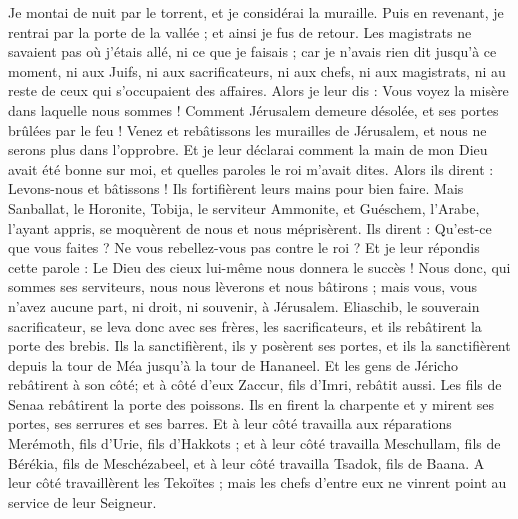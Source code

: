 \begin{multicols}{2}
Je montai de nuit par le torrent, et je considérai la muraille. Puis en revenant, je rentrai par la porte de la vallée ; et ainsi je fus de retour.
Les magistrats ne savaient pas où j'étais allé, ni ce que je faisais ; car je n'avais rien dit jusqu’à ce moment, ni aux Juifs, ni aux sacrificateurs, ni aux chefs, ni aux magistrats, ni au reste de ceux qui s'occupaient des affaires.
Alors je leur dis : Vous voyez la misère dans laquelle nous sommes ! Comment Jérusalem demeure désolée, et ses portes brûlées par le feu ! Venez et rebâtissons les murailles de Jérusalem, et nous ne serons plus dans l’opprobre.
Et je leur déclarai comment la main de mon Dieu avait été bonne sur moi, et quelles paroles le roi m'avait dites. Alors ils dirent : Levons-nous et bâtissons ! Ils fortifièrent leurs mains pour bien faire.
Mais Sanballat, le Horonite, Tobija, le serviteur Ammonite, et Guéschem, l’Arabe, l'ayant appris, se moquèrent de nous et nous méprisèrent. Ils dirent : Qu'est-ce que vous faites ? Ne vous rebellez-vous pas contre le roi ?
Et je leur répondis cette parole : Le Dieu des cieux lui-même nous donnera le succès ! Nous donc, qui sommes ses serviteurs, nous nous lèverons et nous bâtirons ; mais vous, vous n'avez aucune part, ni droit, ni souvenir, à Jérusalem.
\VerseOne{}Eliaschib, le souverain sacrificateur, se leva donc avec ses frères, les sacrificateurs, et ils rebâtirent la porte des brebis. Ils la sanctifièrent, ils y posèrent ses portes, et ils la sanctifièrent depuis la tour de Méa jusqu'à la tour de Hananeel.
Et les gens de Jéricho rebâtirent à son côté; et à côté d'eux Zaccur, fils d'Imri, rebâtit aussi.
Les fils de Senaa rebâtirent la porte des poissons. Ils en firent la charpente et y mirent ses portes, ses serrures et ses barres.
Et à leur côté travailla aux réparations Merémoth, fils d'Urie, fils d'Hakkots ; et à leur côté travailla Meschullam, fils de Bérékia, fils de Meschézabeel, et à leur côté travailla Tsadok, fils de Baana.
A leur côté travaillèrent les Tekoïtes ; mais les chefs d'entre eux ne vinrent point au service de leur Seigneur.

\end{multicols}
